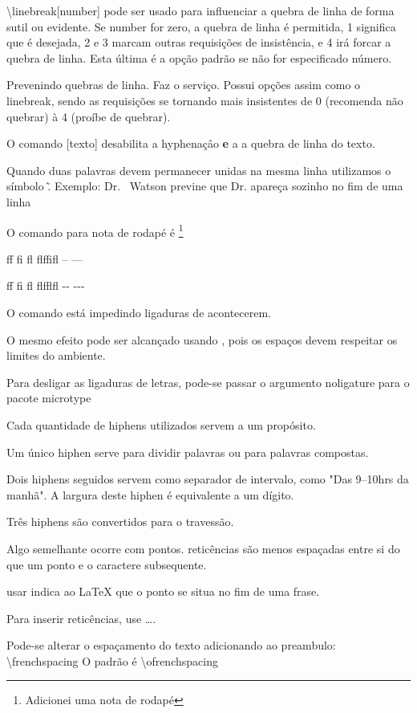 \documentclass{article}
\begin{document}
\textbackslash linebreak[number] pode ser usado para influenciar a quebra de linha de forma sutil ou evidente.
Se number for zero, a quebra de linha é permitida, 1 significa que é desejada, 2 e 3 marcam outras requisições de insistência, e 4 irá forcar a quebra de linha.
Esta última é a opção padrão se não for especificado número.

Prevenindo quebras de linha.
\nolinebreak Faz o serviço.
Possui opções assim como o linebreak, sendo as requisições 
se tornando mais insistentes de 0 (recomenda não quebrar)
à 4 (proíbe de quebrar).

O comando \mbox[texto] desabilita a hyphenaçâo \textbf{e} a 
a quebra de linha do texto.

Quando duas palavras devem permanecer unidas na mesma linha utilizamos o símbolo \~.
Exemplo:
Dr. ~Watson previne que Dr. apareça sozinho no fim de uma linha

O comando para nota de rodapé é \footnote{Adicionei uma nota de rodapé}


ff fi fl flffifl -- ---

f\/f f\/i f\/l f\/l\/f\/f\/l\/f\/l -\/- -\/-\/-

O comando \/ está impedindo ligaduras de acontecerem.

O mesmo efeito pode ser alcançado usando {},
pois os espaços devem respeitar os limites do ambiente.

Para desligar as ligaduras de letras, pode-se passar o argumento noligature para o pacote microtype

Cada quantidade de hiphens utilizados servem a um propósito.

Um único hiphen serve para dividir palavras ou para palavras compostas.

Dois hiphens seguidos servem como separador de intervalo, como
"Das 9--10hrs da manhã".
A largura deste hiphen é equivalente a um dígito.

Três hiphens são convertidos para o travessão.

Algo semelhante ocorre com pontos.
reticências são menos espaçadas entre si do que um ponto 
e o caractere subsequente.

usar \@ indica ao LaTeX que o ponto se situa no fim de uma frase.

Para inserir reticências, use \ldots.

Pode-se alterar o espaçamento do texto adicionando ao preambulo:
\textbackslash frenchspacing
O padrão é \textbackslash ofrenchspacing
\end{document}
